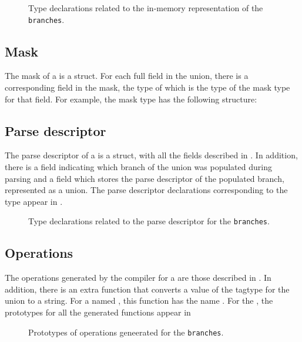 \begin{figure}

\caption{Type declarations related to the in-memory representation of
  the \Punion{} \texttt{branches}.}
\label{fig:punion-rep}
\end{figure}

\subsection{Mask}
\label{sec:unions-masks}
The mask of a \Punion{} is a \C{} struct.  
For each full field in the union,
there is a corresponding field in the mask, the type of which is the
type of the mask type for that field.   For example, the mask type
 has the following structure:


\subsection{Parse descriptor}
\label{sec:unions-parse-descriptors}
The parse descriptor of a \Punion{} is a \C{} struct, with all
the fields described in . In
addition,  there is a  field indicating which branch of the
union was populated during parsing and a  field which stores
the parse descriptor of the populated branch, represented as a \C{}
union.  The parse descriptor declarations corresponding to the
\pads{} type 
appear in .

\begin{figure}

\caption{Type declarations related to the parse descriptor for
  the \Punion{} \texttt{branches}.}
\label{fig:punion-pd}
\end{figure}

\subsection{Operations}
The operations generated by the \pads{} compiler for a \Punion{} are
those described in .  In addition, there
is an extra function that converts a value of the tagtype for the
union to a string.  For a \Punion{} named , this function
has the name .  
For the \Punion{}
, the prototypes for all the generated functions appear in
\begin{figure}

\caption{Prototypes of operations geneerated for
  the \Punion{} \texttt{branches}.}
\label{fig:punion-ops}
\end{figure}




